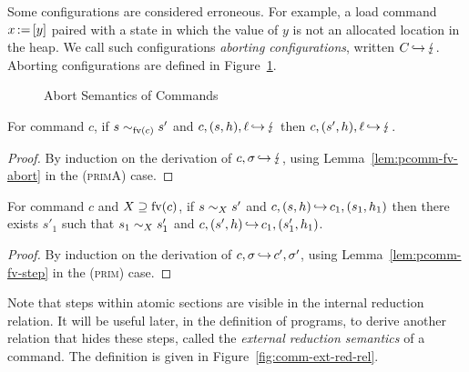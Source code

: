 \documentclass[11pt]{report}
\begin{document}
Some configurations are considered erroneous. For example, a load command $x \operatorname{:\!=} \left[ y \right]$ paired with a state in which the value of $y$ is not an allocated location in the heap. We call such configurations \emph{aborting configurations}, written $C \operatorname{\hookrightarrow} \lightning$. Aborting configurations are defined in Figure~\ref{fig:comm-abort-rel}. 

\begin{figure}[h]
	\centering
	
	\vspace{1em}
	
			
	\vspace{1em}


	\vspace{1em}


	\caption{Abort Semantics of Commands}
	\label{fig:comm-abort-rel}
\end{figure}

\begin{lemma}
	\label{lem:comm-fv-abort}
	For command $c$, if $s \sim_{\mathrm{fv}(c)} s'$ and $c,(s,h),\ell \operatorname{\hookrightarrow} \lightning$ then $c,(s',h),\ell \operatorname{\hookrightarrow} \lightning$. 
\end{lemma}

\begin{proof}
	By induction on the derivation of $c,\sigma \operatorname{\hookrightarrow} \lightning$, using Lemma~\ref{lem:pcomm-fv-abort} in the \textsc{(primA)} case. 
\end{proof}

\begin{lemma}\label{lem:comm-fv-step}
	For command $c$ and $X \supseteq \mathrm{fv}(c)$, if $s \sim_{X} s'$ and $c,(s,h) \operatorname{\hookrightarrow} c_1,(s_1,h_1)$ then there exists $s'_1$  such that $s_1 \sim_{X} s'_1$ and $c,(s',h) \operatorname{\hookrightarrow} c_1,(s'_1,h_1)$.
\end{lemma}

\begin{proof}
	 By induction on the derivation of $c,\sigma \operatorname{\hookrightarrow} c',\sigma'$, using Lemma~\ref{lem:pcomm-fv-step} in the \textsc{(prim)} case.
\end{proof}

Note that steps within atomic sections are visible in the internal reduction relation. It will be useful later, in the definition of programs, to derive another relation that hides these steps, called the \emph{external reduction semantics} of a command. The definition is given in Figure~\ref{fig:comm-ext-red-rel}. 
\end{document}

